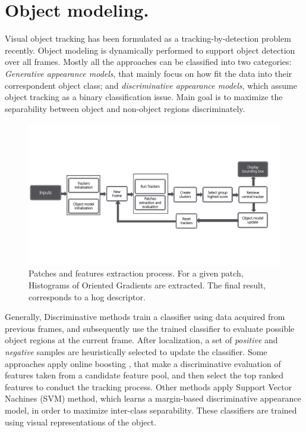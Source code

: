 \section{Object modeling.}
Visual object tracking has been formulated as a tracking-by-detection problem
recently. Object modeling is dynamically performed to support object detection
over all frames. Mostly all the approaches can be classified into two categories:
\textit{Generative appearance models}, that mainly focus on how fit the data into
their correspondent object class; and \textit{discriminative appearance models},
which assume object tracking as a binary classification issue. Main goal is to
maximize the separability between object and non-object regions discriminately.

\begin{figure}[t!]
\centering
\includegraphics[page=3, width=1\linewidth, trim= 0.4cm 9.9cm 7.5cm 1.8cm,
                 clip=true]{Figures/global_diagram}
\caption[Patches and features extraction process]
{\small Patches and features extraction process. For a given patch, Histograms
of Oriented Gradients are extracted. The final result, corresponds to a hog
descriptor.
}
\label{fig::features_extraction}
\end{figure}

Generally, Discriminative methods train a classifier using data acquired from
previous frames, and subsequently use the trained classifier to evaluate
possible object regions at the current frame. After localization, a set of
\textit{positive} and \textit{negative} samples are heuristically selected to
update the classifier. Some approaches apply online boosting
\cite{Babenko2010,Grabner2008,Grabner2006}, that make a discriminative
evaluation of features taken from a candidate feature pool, and then select the
top ranked features to conduct the tracking process. Other methods apply
Support Vector Nachines (SVM) method, which learns a margin-based discriminative
appearance model, in order to maximize inter-class separability. These
classifiers are trained using visual representations of the object.

